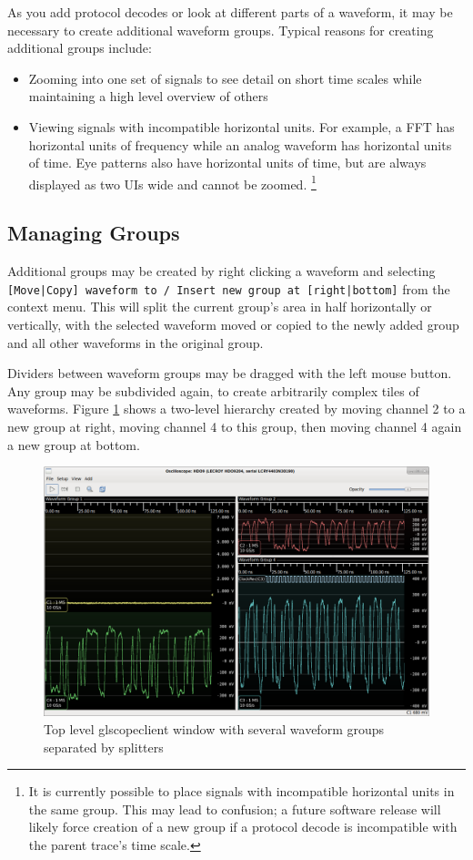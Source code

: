 \documentclass[11pt]{article}
\newcommand{\menustyle}[1]{\texttt{#1}}
\begin{document}
As you add protocol decodes or look at different parts of a waveform, it may be necessary to create additional waveform
groups. Typical reasons for creating additional groups include:

\begin{itemize}
\item Zooming into one set of signals to see detail on short time scales while maintaining a high level overview of
others
\item Viewing signals with incompatible horizontal units. For example, a FFT has horizontal units of frequency while an
analog waveform has horizontal units of time. Eye patterns also have horizontal units of time, but are always displayed
as two UIs wide and cannot be zoomed.
\footnote
{
It is currently possible to place signals with incompatible horizontal units in the same group. This may lead to
confusion; a future software release will likely force creation of a new group if a protocol decode is incompatible
with the parent trace's time scale.
}
\end{itemize}

\subsection{Managing Groups}

Additional groups may be created by right clicking a waveform and selecting \menustyle{[Move|Copy] waveform to / Insert
new group at [right|bottom]} from the context menu. This will split the current group's area in half horizontally or
vertically, with the selected waveform moved or copied to the newly added group and all other waveforms in the original
group.

Dividers between waveform groups may be dragged with the left mouse button. Any group may be subdivided again, to
create arbitrarily complex tiles of waveforms. Figure \ref{multiple-groups} shows a two-level hierarchy created by
moving channel 2 to a new group at right, moving channel 4 to this group, then moving channel 4 again a new group at
bottom.

\begin{figure}[h]
\centering
\includegraphics[width=14cm]{images/multiple-groups.png}
\caption{Top level glscopeclient window with several waveform groups separated by splitters}
\label{multiple-groups}
\end{figure}
\end{document}

